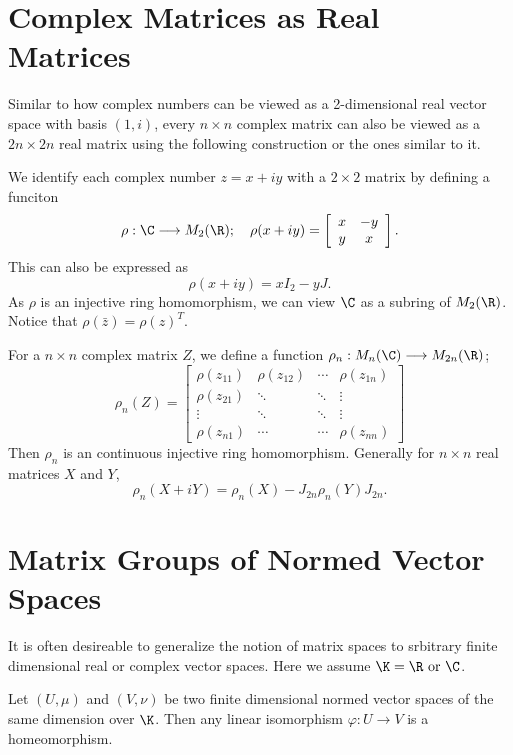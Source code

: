 \section{Complex Matrices as Real Matrices}

Similar to how complex numbers can be viewed as a 2-dimensional real vector space with
basis \((1,i)\), every \(n\times n\) complex matrix can also be viewed as a \(2n\times 2n\)
real matrix using the following construction or the ones similar to it.

We identify each complex number \(z=x+iy\) with a \(2\times 2\) matrix by defining a funciton
\[ \rho :\C\longrightarrow M_2(\R);\hspace{10px} \rho(x+iy) = \left[\begin{array}{cc} x & -y \\ y & x \end{array}\right]. \]
This can also be expressed as
\[ \rho(x+iy) = xI_2 - yJ. \]
As \(\rho\) is an injective ring homomorphism, we can view \(\C\) as a subring of \(M_2(\R)\).
Notice that \(\rho(\bar{z})=\rho(z)^T\).

For a \(n\times n\) complex matrix \(Z\), we define a function \(\rho_n: M_n(\C)\longrightarrow M_{2n}(\R)\);
\[
  \rho_n(Z)=
  \left[\begin{array}{cccc}
      \rho(z_{11}) & \rho(z_{12}) & \cdots & \rho(z_{1n}) \\
      \rho(z_{21}) & \ddots & \ddots & \vdots \\
      \vdots & \ddots & \ddots & \vdots \\
      \rho(z_{n1})& \cdots & \cdots & \rho(z_{nn})
  \end{array}\right]
\]
Then \(\rho_n\) is an continuous injective ring homomorphism. Generally for \(n\times n\)
real matrices \(X\) and \(Y\),
\[ \rho_n(X+iY)=\rho_n(X)-J_{2n}\rho_n(Y)J_{2n}. \]

\section{Matrix Groups of Normed Vector Spaces}

It is often desireable to generalize the notion of matrix spaces to srbitrary finite dimensional
real or complex vector spaces. Here we assume \(\K=\R\text{ or }\C\).

\begin{theorem}
  Let \((U,\mu)\) and \((V,\nu)\) be two finite dimensional normed vector spaces of the
  same dimension over \(\K\). Then any linear isomorphism \(\varphi:U\longrightarrow V\) is
  a homeomorphism.
\end{theorem}

